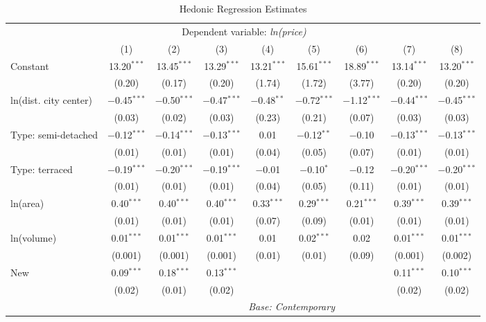 \documentclass[]{article}
\begin{document}
\begin{table}[!htbp] \centering 
  \caption{Hedonic Regression Estimates} 
  \label{tab:hedreg} 
\footnotesize 
\begin{tabular}{@{\extracolsep{5pt}}lcccccccc} 
\toprule
 & \multicolumn{6}{c}{Dependent variable: \emph{ln(price)}} \\ 
\cmidrule{2-9} 
 & (1) & (2) & (3) & (4) & (5) & (6) & (7) & (8)\\ 
\midrule
Constant & 13.20$^{***}$ & 13.45$^{***}$ & 13.29$^{***}$ & 13.21$^{***}$ & 15.61$^{***}$ & 18.89$^{***}$ & 13.14$^{***}$ & 13.20$^{***}$ \\ 
  & (0.20) & (0.17) & (0.20) & (1.74) & (1.72) & (3.77) & (0.20) & (0.20) \\ 
  ln(dist. city center) & $-$0.45$^{***}$ & $-$0.50$^{***}$ & $-$0.47$^{***}$ & $-$0.48$^{**}$ & $-$0.72$^{***}$ & $-$1.12$^{***}$ & $-$0.44$^{***}$ & $-$0.45$^{***}$ \\ 
  & (0.03) & (0.02) & (0.03) & (0.23) & (0.21) & (0.07) & (0.03) & (0.03) \\ 
  Type: semi-detached & $-$0.12$^{***}$ & $-$0.14$^{***}$ & $-$0.13$^{***}$ & 0.01 & $-$0.12$^{**}$ & $-$0.10 & $-$0.13$^{***}$ & $-$0.13$^{***}$ \\ 
  & (0.01) & (0.01) & (0.01) & (0.04) & (0.05) & (0.07) & (0.01) & (0.01) \\ 
  Type: terraced & $-$0.19$^{***}$ & $-$0.20$^{***}$ & $-$0.19$^{***}$ & $-$0.01 & $-$0.10$^{*}$ & $-$0.12 & $-$0.20$^{***}$ & $-$0.20$^{***}$ \\ 
  & (0.01) & (0.01) & (0.01) & (0.04) & (0.05) & (0.11) & (0.01) & (0.01) \\ 
  ln(area) & 0.40$^{***}$ & 0.40$^{***}$ & 0.40$^{***}$ & 0.33$^{***}$ & 0.29$^{***}$ & 0.21$^{***}$ & 0.39$^{***}$ & 0.39$^{***}$ \\ 
  & (0.01) & (0.01) & (0.01) & (0.07) & (0.09) & (0.01) & (0.01) & (0.01) \\ 
  ln(volume) & 0.01$^{***}$ & 0.01$^{***}$ & 0.01$^{***}$ & 0.01 & 0.02$^{***}$ & 0.02 & 0.01$^{***}$ & 0.01$^{***}$ \\ 
  & (0.001) & (0.001) & (0.001) & (0.01) & (0.01) & (0.09) & (0.001) & (0.002) \\ 
  New & 0.09$^{***}$ & 0.18$^{***}$ & 0.13$^{***}$ &  &  &  & 0.11$^{***}$ & 0.10$^{***}$ \\ 
  & (0.02) & (0.01) & (0.02) &  &  &  & (0.02) & (0.02) \\ 
  \cmidrule{2-9}
  & \multicolumn{8}{c}{\emph{Base: Contemporary}} \\

\end{tabular}
\end{table}
\end{document}
